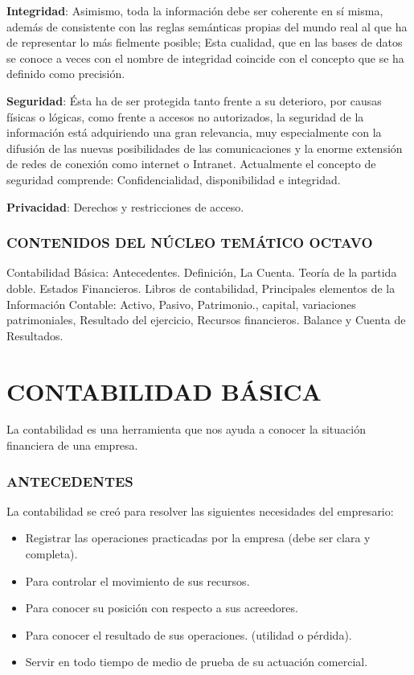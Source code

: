 \textbf{Integridad}: Asimismo, toda la información debe ser coherente en sí misma, además de consistente con las reglas semánticas propias del mundo real al que ha de representar lo más fielmente posible; Esta cualidad, que en las bases de datos se conoce a veces con el nombre de integridad coincide con el concepto que se ha definido como precisión.

\textbf{Seguridad}: Ésta ha de ser protegida tanto frente a su deterioro, por causas físicas o lógicas, como frente a accesos no autorizados, la seguridad de la información está adquiriendo una gran relevancia, muy especialmente con la difusión de las nuevas posibilidades de las comunicaciones y la enorme extensión de redes de conexión como internet o Intranet. Actualmente el concepto de seguridad comprende: Confidencialidad, disponibilidad e integridad.

\textbf{Privacidad}: Derechos y restricciones de acceso.



\subsubsection*{CONTENIDOS DEL NÚCLEO TEMÁTICO OCTAVO}
Contabilidad Básica: Antecedentes. Definición, La Cuenta. Teoría de la partida doble. Estados Financieros. Libros de contabilidad, Principales elementos de la Información Contable: Activo, Pasivo, Patrimonio., capital, variaciones patrimoniales, Resultado del ejercicio, Recursos financieros. Balance y Cuenta de Resultados.

\section*{CONTABILIDAD BÁSICA}
La contabilidad es una herramienta que nos ayuda a conocer la situación financiera de una empresa.

\subsubsection*{ANTECEDENTES}
La contabilidad se creó para resolver las siguientes necesidades del empresario:

\begin{itemize}
  \item Registrar las operaciones practicadas por la empresa (debe ser clara y completa).
  \item Para controlar el movimiento de sus recursos.
  \item Para conocer su posición con respecto a sus acreedores.
  \item Para conocer el resultado de sus operaciones. (utilidad o pérdida).
  \item Servir en todo tiempo de medio de prueba de su actuación comercial.
\end{itemize}
